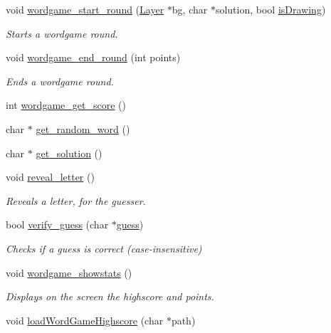 \begin{DoxyCompactItemize}
void \mbox{\hyperlink{group__wordpicker_gabec56325a776cfd186cc799eb7a8c6b8}{wordgame\+\_\+start\+\_\+round}} (\mbox{\hyperlink{struct_layer}{Layer}} $\ast$bg, char $\ast$solution, bool \mbox{\hyperlink{canvas_8c_a9f832b80ca0857bc38fca999ddd9d7b0}{is\+Drawing}})
\begin{DoxyCompactList}\small\item\em Starts a wordgame round. \end{DoxyCompactList}\item 
void \mbox{\hyperlink{group__wordpicker_ga0b9b141f8ba315b5f78506c4d0bdc666}{wordgame\+\_\+end\+\_\+round}} (int points)
\begin{DoxyCompactList}\small\item\em Ends a wordgame round. \end{DoxyCompactList}\item 
int \mbox{\hyperlink{group__wordpicker_ga620548888658cd02972c55f77dfda24b}{wordgame\+\_\+get\+\_\+score}} ()
\item 
char $\ast$ \mbox{\hyperlink{group__wordpicker_gae82a8e0c2ea083c8aeb39f8dcd1357a6}{get\+\_\+random\+\_\+word}} ()
\item 
char $\ast$ \mbox{\hyperlink{group__wordpicker_gac8454d96157b95fc004c5188c7879cb7}{get\+\_\+solution}} ()
\item 
void \mbox{\hyperlink{group__wordpicker_gaed4201a80c5cb2936c795fa51d9f0841}{reveal\+\_\+letter}} ()
\begin{DoxyCompactList}\small\item\em Reveals a letter, for the guesser. \end{DoxyCompactList}\item 
bool \mbox{\hyperlink{group__wordpicker_ga6353a81725e186791f470cbd96c7ec1b}{verify\+\_\+guess}} (char $\ast$\mbox{\hyperlink{group__pengoo_ga089d0f37444b1b486cf98045a512deed}{guess}})
\begin{DoxyCompactList}\small\item\em Checks if a guess is correct (case-\/insensitive) \end{DoxyCompactList}\item 
void \mbox{\hyperlink{group__wordpicker_ga88c86e1108700ca4a9a38a276e70e3c9}{wordgame\+\_\+showstats}} ()
\begin{DoxyCompactList}\small\item\em Displays on the screen the highscore and points. \end{DoxyCompactList}\item 
void \mbox{\hyperlink{group__wordpicker_gab63191abcd00066c036c0b26e148651a}{load\+Word\+Game\+Highscore}} (char $\ast$path)

\end{DoxyCompactItemize}
